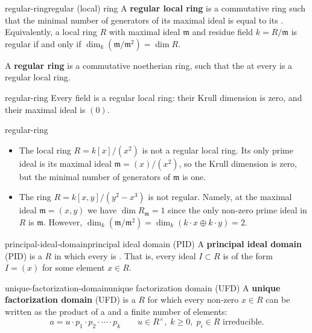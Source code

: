 \begin{topic}{regular-ring}{regular (local) ring}
    A \textbf{regular local ring} is a commutative   ring such that the minimal number of generators of its maximal ideal is equal to its . Equivalently, a local ring $R$ with maximal ideal $\mathfrak{m}$ and residue field $k = R / \mathfrak{m}$ is regular if and only if $\dim_k(\mathfrak{m} / \mathfrak{m}^2) = \dim R$.
    
    A \textbf{regular ring} is a commutative noetherian ring, such that the  at every  is a regular local ring.
\end{topic}

\begin{example}{regular-ring}
    Every field is a regular local ring: their Krull dimension is zero, and their maximal ideal is $(0)$.
\end{example}

\begin{example}{regular-ring}
    \begin{itemize}
        \item The local ring $R = k[x]/(x^2)$ is not a regular local ring. Its only prime ideal is its maximal ideal $\mathfrak{m} = (x)/(x^2)$, so the Krull dimension is zero, but the minimal number of generators of $\mathfrak{m}$ is one.
        \item The ring $R = k[x, y]/(y^2 - x^3)$ is not regular. Namely, at the maximal ideal $\mathfrak{m} = (x, y)$ we have $\dim R_\mathfrak{m} = 1$ since the only non-zero prime ideal in $R$ is $\mathfrak{m}$. However, $\dim_k(\mathfrak{m} / \mathfrak{m}^2) = \dim_k(k \cdot x \oplus k \cdot y) = 2$.
    \end{itemize}
\end{example}

\begin{topic}{principal-ideal-domain}{principal ideal domain (PID)}
    A \textbf{principal ideal domain} (PID) is a  $R$ in which every  is . That is, every ideal $I \subset R$ is of the form $I = (x)$ for some element $x \in R$.
\end{topic}

\begin{topic}{unique-factorization-domain}{unique factorization domain (UFD)}
    A \textbf{unique factorization domain} (UFD) is a  $R$ for which every non-zero $x \in R$ can be written as the product of a  and a finite number of  elements:
    \[ a = u \cdot p_1 \cdot p_2 \cdot \cdots \cdot p_k \qquad u \in R^\times, \; k \ge 0, \; p_i \in R \text{ irreducible}. \]
\end{topic}

